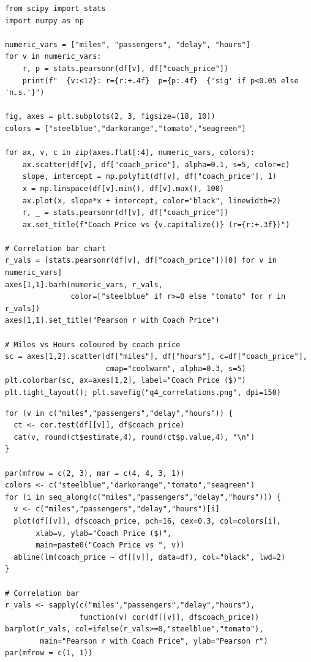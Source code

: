 \documentclass[12pt, a4paper]{report}
\begin{document}
\begin{lstlisting}[style=python, caption={Python — Pearson correlation tests and scatter plots}]
from scipy import stats
import numpy as np

numeric_vars = ["miles", "passengers", "delay", "hours"]
for v in numeric_vars:
    r, p = stats.pearsonr(df[v], df["coach_price"])
    print(f"  {v:<12}: r={r:+.4f}  p={p:.4f}  {'sig' if p<0.05 else 'n.s.'}")

fig, axes = plt.subplots(2, 3, figsize=(18, 10))
colors = ["steelblue","darkorange","tomato","seagreen"]

for ax, v, c in zip(axes.flat[:4], numeric_vars, colors):
    ax.scatter(df[v], df["coach_price"], alpha=0.1, s=5, color=c)
    slope, intercept = np.polyfit(df[v], df["coach_price"], 1)
    x = np.linspace(df[v].min(), df[v].max(), 100)
    ax.plot(x, slope*x + intercept, color="black", linewidth=2)
    r, _ = stats.pearsonr(df[v], df["coach_price"])
    ax.set_title(f"Coach Price vs {v.capitalize()} (r={r:+.3f})")

# Correlation bar chart
r_vals = [stats.pearsonr(df[v], df["coach_price"])[0] for v in numeric_vars]
axes[1,1].barh(numeric_vars, r_vals,
               color=["steelblue" if r>=0 else "tomato" for r in r_vals])
axes[1,1].set_title("Pearson r with Coach Price")

# Miles vs Hours coloured by coach price
sc = axes[1,2].scatter(df["miles"], df["hours"], c=df["coach_price"],
                       cmap="coolwarm", alpha=0.3, s=5)
plt.colorbar(sc, ax=axes[1,2], label="Coach Price ($)")
plt.tight_layout(); plt.savefig("q4_correlations.png", dpi=150)
\end{lstlisting}

\begin{lstlisting}[style=Rcode, caption={R — Pearson correlation tests and scatter plots}]
for (v in c("miles","passengers","delay","hours")) {
  ct <- cor.test(df[[v]], df$coach_price)
  cat(v, round(ct$estimate,4), round(ct$p.value,4), "\n")
}

par(mfrow = c(2, 3), mar = c(4, 4, 3, 1))
colors <- c("steelblue","darkorange","tomato","seagreen")
for (i in seq_along(c("miles","passengers","delay","hours"))) {
  v <- c("miles","passengers","delay","hours")[i]
  plot(df[[v]], df$coach_price, pch=16, cex=0.3, col=colors[i],
       xlab=v, ylab="Coach Price ($)",
       main=paste0("Coach Price vs ", v))
  abline(lm(coach_price ~ df[[v]], data=df), col="black", lwd=2)
}

# Correlation bar
r_vals <- sapply(c("miles","passengers","delay","hours"),
                 function(v) cor(df[[v]], df$coach_price))
barplot(r_vals, col=ifelse(r_vals>=0,"steelblue","tomato"),
        main="Pearson r with Coach Price", ylab="Pearson r")
par(mfrow = c(1, 1))
\end{lstlisting}
\end{document}
